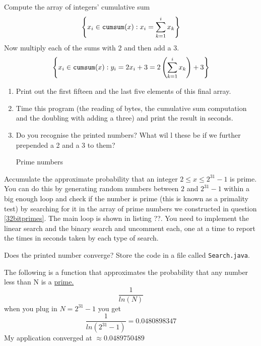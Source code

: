 \documentclass{homework}
\newcommand\callit[1]{Store the code in a file called \texttt{#1}.}
\begin{document}
Compute the array of integers' cumulative sum \ie
\[
  \left\{x_i \in \mathtt{cumsum}(x) : x_i = \sum_{k=1}^{i} x_k\right\}
\]
Now multiply each of the sums with 2 and then add a 3.
\[
  \left\{x_i \in \mathtt{cumsum}(x) :
    y_i = 2x_i+3 = 2\left(\sum_{k=1}^{i} x_k\right)+3\right\}
\]
\begin{enumerate}
  \item Print out the first fifteen and the last five elements of this
        final array.
  \item Time this program (the reading of bytes, the cumulative sum
        computation and the doubling with adding a three) and print the
        result in seconds.
  \item Do you recognise the printed numbers? What wil  l these be if we
        further prepended a 2 and a 3 to them?
        \begin{sol}
          Prime numbers
        \end{sol}
\end{enumerate}


\question Accumulate the approximate probability that an integer $2 \leq x
  \leq 2^{31}-1$ is prime. You can do this by generating random
numbers between $2$ and $2^{31}-1$ within a big enough loop and
check if the number is prime (this is known as a primality test)
by searching for it in the array of prime numbers we constructed
in
question \ref{32bitprimes}.  The main loop is shown in listing
??.  You need to implement the linear search and the
binary search and uncomment each, one at a time to report the times in
seconds taken by each type of search.

% 

Does the printed number converge? \callit{Search.java}

\begin{sol}
  The following is a function that approximates the probability that any number less than N is a \href{https://en.wikipedia.org/wiki/Prime_number_theorem#:~:text=This%20means%20that%20for%20large%20enough%20N,%20the%20probability%20that%20a%20random%20integer%20not%20greater%20than%20N%20is%20prime%20is%20very%20close%20to%201%20/%20log(N).}{prime.}
  \[
    \frac{1}{ln(N)}
  \]
  when you plug in $N=2^{31}-1$ you get 
  \[
    \frac{1}{ln(2^{31}-1)}=0.0480898347
  \]
  My application converged at $\approx 0.0489750489$
  
\end{sol}
\end{document}
